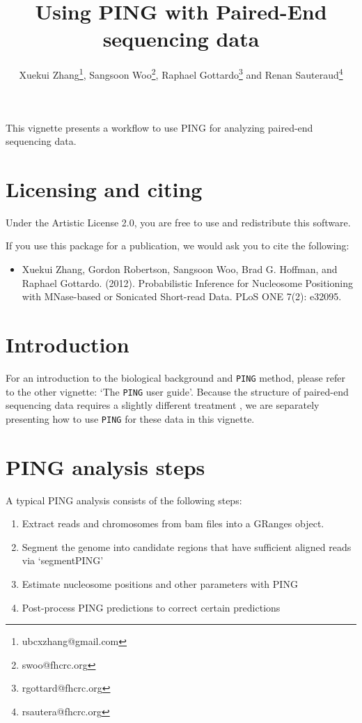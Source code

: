 \documentclass[11pt]{article}
\title{Using PING with Paired-End sequencing data}
\author{Xuekui Zhang\footnote{ubcxzhang@gmail.com}, Sangsoon
Woo\footnote{swoo@fhcrc.org}, Raphael Gottardo\footnote{rgottard@fhcrc.org} and
Renan Sauteraud\footnote{rsautera@fhcrc.org}}
\begin{document}
\maketitle



\textnormal {\normalfont}
This vignette presents a workflow to use PING for analyzing paired-end sequencing data.

\tableofcontents
\newpage


\section{Licensing and citing}

Under the Artistic License 2.0, you are free to use and redistribute this software. 

If you use this package for a publication, we would ask you to cite the following: 

\begin{itemize}
\item[] Xuekui Zhang, Gordon Robertson, Sangsoon Woo, Brad G. Hoffman, and Raphael Gottardo. (2012). Probabilistic Inference for Nucleosome Positioning with MNase-based or Sonicated Short-read Data. PLoS ONE 7(2): e32095.
\end{itemize}


\section{Introduction}
For an introduction to the biological background and \texttt{PING} method, please refer to the other vignette: `The \texttt{PING} user guide'. Because the structure of paired-end sequencing data requires a slightly different treatment , we are separately presenting how to use \texttt{PING} for these data in this vignette. 


\section{PING analysis steps}
A typical PING analysis consists of the following steps:
\begin{enumerate}
  \item Extract reads and chromosomes from bam files into a GRanges object.
  \item Segment the genome into candidate regions that have sufficient aligned reads via `segmentPING'
  \item Estimate nucleosome positions and other parameters with PING
  \item Post-process PING predictions to correct certain predictions
\end{enumerate}
\end{document}
